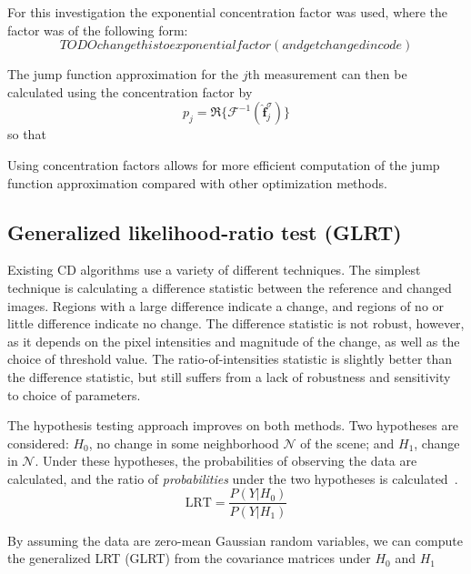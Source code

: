 \documentclass{article}
\begin{document}
For this investigation the exponential concentration factor was used, where the factor was of the following form:
\begin{equation}\label{eq:conc_factor}
    TODO change this to exponential factor (and get changed in code)
\end{equation}

The jump function approximation for the $j$th measurement can then be calculated using the concentration factor by
\[
p_j = \Re\{ \mathcal{F}^{-1}(\hat{\mathbf{f}}^\sigma_j) \}
\]
so that %

Using concentration factors allows for more efficient computation of the jump function approximation compared with other optimization methods.

\subsection{Generalized likelihood-ratio test (GLRT)}

Existing CD algorithms use a variety of different techniques. The simplest technique is calculating a difference statistic between the reference and changed images. Regions with a large difference indicate a change, and regions of no or little difference indicate no change. The difference statistic is not robust, however, as it depends on the pixel intensities and magnitude of the change, as well as the choice of threshold value. The ratio-of-intensities statistic is slightly better than the difference statistic, but still suffers from a lack of robustness and sensitivity to choice of parameters.

The hypothesis testing approach improves on both methods. Two hypotheses are considered: $H_0$, no change in some neighborhood $\mathcal{N}$ of the scene; and $H_1$, change in $\mathcal{N}$. Under these hypotheses, the probabilities of observing the data are calculated, and the ratio of \emph{probabilities} under the two hypotheses is calculated~\cite{novak_2005}.
\begin{equation}
    \text{LRT} = \frac{P(Y | H_0)}{P(Y | H_1)}
\end{equation}

By assuming the data are zero-mean Gaussian random variables, we can compute the generalized LRT (GLRT) from the covariance matrices under $H_0$ and $H_1$
\end{document}

